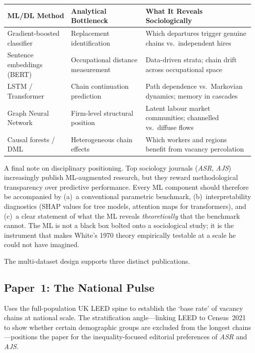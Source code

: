 \documentclass[a4paper]{tufte-handout}
\begin{document}
\begin{fullwidth}
\smallskip
\small
\begin{tabularx}{\linewidth}{@{}l l X@{}}
  \toprule
  \textbf{ML/DL Method} & \textbf{Analytical Bottleneck} & \textbf{What It Reveals Sociologically} \\
  \midrule
  Gradient-boosted classifier & Replacement identification & Which departures trigger genuine chains vs.\ independent hires \\[3pt]
  Sentence embeddings (BERT) & Occupational distance measurement & Data-driven strata; chain drift across occupational space \\[3pt]
  LSTM / Transformer & Chain continuation prediction & Path dependence vs.\ Markovian dynamics; memory in cascades \\[3pt]
  Graph Neural Network & Firm-level structural position & Latent labour market communities; channelled vs.\ diffuse flows \\[3pt]
  Causal forests / DML & Heterogeneous chain effects & Which workers and regions benefit from vacancy percolation \\
  \bottomrule
\end{tabularx}
\smallskip
\end{fullwidth}

A final note on disciplinary positioning. Top sociology journals (\emph{ASR}, \emph{AJS}) increasingly publish ML-augmented research, but they reward methodological transparency over predictive performance. Every ML component should therefore be accompanied by (a)~a conventional parametric benchmark, (b)~interpretability diagnostics (SHAP values for tree models, attention maps for transformers), and (c)~a clear statement of what the ML reveals \emph{theoretically} that the benchmark cannot. The ML is not a black box bolted onto a sociological study; it is the instrument that makes White's 1970 theory empirically testable at a scale he could not have imagined.



The multi-dataset design supports three distinct publications.

\subsection{Paper~1: The National Pulse}
Uses the full-population UK LEED spine to establish the `base rate' of vacancy chains at national scale. The stratification angle---linking LEED to Census~2021 to show whether certain demographic groups are excluded from the longest chains---positions the paper for the inequality-focused editorial preferences of \emph{ASR} and \emph{AJS}.
\end{document}

